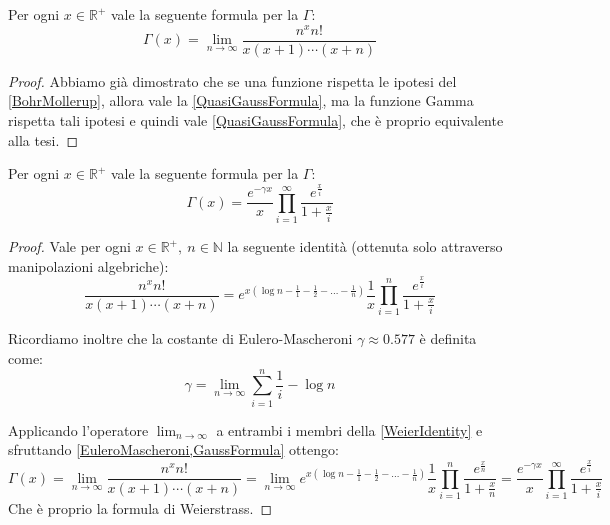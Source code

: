 \begin{corollary}\label{GaussFormula}
	Per ogni $x\in\mathbb{R^+}$ vale la seguente formula per la $\Gamma$:
\begin{equation*}
	\Gamma(x)=\lim_{n\to \infty} \frac{n^xn!}{x(x+1)\cdots(x+n)}
\end{equation*}
\end{corollary}
\begin{proof}
	Abbiamo già dimostrato che se una funzione rispetta le ipotesi del \cref{BohrMollerup}, allora vale la 
	\cref{QuasiGaussFormula}, ma la funzione Gamma rispetta tali ipotesi e quindi vale 
	\cref{QuasiGaussFormula}, che è proprio equivalente alla tesi.
	
\end{proof}

\begin{corollary}\label{WeierstrassFormula}
	Per ogni $x\in\mathbb{R^+}$ vale la seguente formula per la $\Gamma$:
\begin{equation*}
	\Gamma(x)=\frac{e^{-\gamma x}}x\prod_{i=1}^{\infty} \frac{e^{\frac xi}}{1+\frac xi}
\end{equation*}
\end{corollary}
\begin{proof}
	Vale per ogni $x\in\mathbb{R^+},\ n\in\mathbb{N}$ la seguente identità (ottenuta solo attraverso manipolazioni algebriche):
	\begin{equation}\label{WeierIdentity}
		\frac{n^xn!}{x(x+1)\cdots (x+n)}=e^{x\left(\log{n}-\frac11-\frac12-\dots-\frac1n\right)}\frac1x\prod_{i=1}^n\frac{e^{\frac xi}}{1+\frac xi}
	\end{equation}
	
	Ricordiamo inoltre che la costante di Eulero-Mascheroni $\gamma\approx0.577$ è definita come:
	\begin{equation}\label{EuleroMascheroni}
		\gamma=\lim_{n\to\infty} \sum_{i=1}^n \frac1i -\log{n}
	\end{equation}
	
	Applicando l'operatore $\lim_{n\to\infty}$ a entrambi i membri della \cref{WeierIdentity} e sfruttando \cref{EuleroMascheroni,GaussFormula} ottengo:
	\begin{equation*}
		\Gamma(x)=\lim_{n\to \infty} \frac{n^xn!}{x(x+1)\cdots(x+n)}
		=\lim_{n\to\infty} e^{x\left(\log{n}-\frac11-\frac12-\dots-\frac1n\right)}\frac1x\prod_{i=1}^n\frac{e^{\frac xn}}{1+\frac xn}
		=\frac{e^{-\gamma x}}x\prod_{i=1}^{\infty} \frac{e^{\frac xi}}{1+\frac xi}
	\end{equation*}
	Che è proprio la formula di Weierstrass.
\end{proof}






